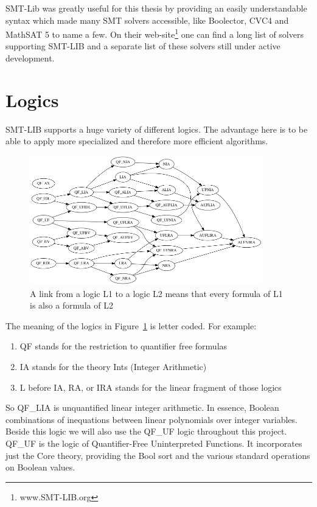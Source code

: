 SMT-Lib was greatly useful for this thesis by providing an easily understandable syntax which made many SMT solvers accessible, like Boolector, CVC4 and MathSAT 5 to name a few. On their web-site\footnote{www.SMT-LIB.org} one can find a long list of solvers supporting SMT-LIB and a separate list of these solvers still under active development.

\section{Logics}
SMT-LIB supports a huge variety of different logics. The advantage here is to be able to apply more specialized and therefore more efficient algorithms.
\begin{figure}
  \centering
  \includegraphics[width=0.9\textwidth]{Pictures/logics.png}  
  \caption{A link from a logic L1 to a logic L2 means that every formula of L1 is also a formula of L2}
  \label{fig:logics}
\end{figure}
The meaning of the logics in Figure~\ref{fig:logics} is letter coded. For example:
\begin{enumerate}
  \item QF stands for the restriction to quantifier free formulas
  \item IA stands for the theory Ints (Integer Arithmetic)
  \item L before IA, RA, or IRA stands for the linear fragment of those logics 
\end{enumerate}
So QF\_LIA is unquantified linear integer arithmetic. In essence, Boolean combinations of inequations between linear polynomials over integer variables. Beside this logic we will also use the QF\_UF logic throughout this project. QF\_UF is the logic of Quantifier-Free Uninterpreted Functions. It incorporates just the Core theory, providing the Bool sort and the various standard operations on Boolean values.
 
